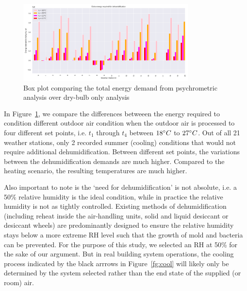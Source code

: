 	\begin{figure}[h!]
	\centering
	\includegraphics[width=0.8\textwidth]{coolsave.png}
	\caption{Box plot comparing the total energy demand from psychrometric analysis over dry-bulb only analysis}\label{fg:coolcities}
	\end{figure}

In Figure~\ref{fg:coolcities}, we compare the differences betweeen the energy required to condition different outdoor air condition when the outdoor air is processed to four different set points, i.e. $t_1$ through $t_4$ between $18 \degree C$ to $27 \degree C$. Out of all 21 weather stations, only 2 recorded summer (cooling) conditions that would not require additional dehumidification. 
Between different set points, the variations between the dehumidification demands are much higher. 
Compared to the heating scenario, the resulting temperatures are much higher. 

Also important to note is the `need for dehumidification' is not absolute, i.e. a 50\% relative humidity is the ideal condition, while in practice the relative humidity is not as tightly controlled. Existing methods of dehumidification (including reheat inside the air-handling units, solid and liquid desiccant or desiccant wheels) are predominantly designed to ensure the relative humidity stays below a more extreme RH level such that the growth of mold and bacteria can be prevented. For the purpose of this study, we selected an RH at 50\% for the sake of our argument. But in real building system operations, the cooling process indicated by the black arrrows in Figure~\ref{fg:cool} will likely only be determined by the system selected rather than the end state of the supplied (or room) air. 
